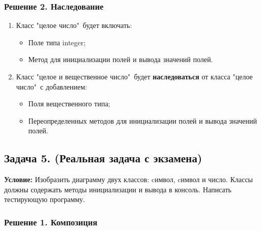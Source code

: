 {}


\newpage
{}



\newpage\subsubsection{Решение 2. Наследование}

\begin{enumerate}
\item Класс "целое число"\ будет включать:
\begin{itemize}
    \item Поле типа integer;
    \item Метод для инициализации полей и вывода значений полей.
\end{itemize}

\item Класс "целое и вещественное число"\ будет {\bf наследоваться} от класса "целое число"\ с добавлением:
\begin{itemize}
    \item Поля вещественного типа;
    \item Переопределенных методов для инициализации полей и вывода значений полей.
\end{itemize}
\end{enumerate}

{}


\newpage
{}



\newpage\subsection{Задача 5. (Реальная задача с экзамена)}
{\bf Условие:} Изобразить диаграмму двух классов: cимвол, cимвол и число. Классы должны содержать методы инициализации и вывода в консоль. Написать тестирующую программу.


\subsubsection{Решение 1. Композиция}

